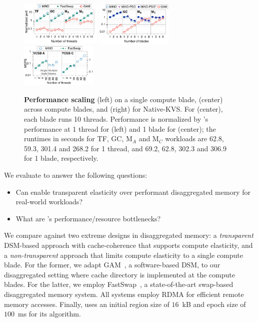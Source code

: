 \begin{figure}[ht!]
  \centering
  \includegraphics[width=0.345\textwidth]{fig/mind/04_intra}\hspace{-0.25em}
  \includegraphics[width=0.3266\textwidth]{fig/mind/04_inter}\hspace{-0.25em}
  \includegraphics[width=0.3247\textwidth]{fig/mind/04_kvs}
  \vspace{-0.7em}
  \caption[Performance scaling]{\textbf{Performance scaling} (left) on a single compute blade, (center) across compute blades, and (right) for Native-KVS. For (center), each blade runs 10 threads. Performance is normalized by \mind's performance at 1 thread for (left) and 1 blade for (center); the runtimes in seconds for TF, GC, M$_A$ and M$_C$ workloads are 62.8, 59.3, 301.4 and 268.2 for 1 thread, and 69.2, 62.8, 302.3 and 306.9 for 1 blade, respectively.}
\label{fig:perf}
\label{fig:perf_intra}
\label{fig:perf_inter}
\label{fig:perf_kvs}
\end{figure}


We evaluate \mind to answer the following questions:
\begin{itemize}[topsep=2pt, partopsep=0pt, itemsep=0pt, leftmargin=*]
  \item Can \mind enable transparent elasticity over performant disaggregated memory for real-world workloads?
  \item What are \mind's performance/resource bottlenecks?
\end{itemize}
 We compare \mind against two extreme designs in disaggregated memory: a \textit{transparent} DSM-based approach with cache-coherence that supports compute elasticity, and a \textit{non-transparent} approach that limits compute elasticity to a single compute blade. For the former, we adapt GAM~\cite{gam}, a software-based DSM, to our disaggregated setting where cache directory is implemented at the compute blades. For the latter, we employ FastSwap~\cite{fastswap}, a state-of-the-art swap-based disaggregated memory system. All systems employ RDMA for efficient remote memory accesses. Finally, \mind uses an initial region size of $16$~kB and epoch size of $100$~ms for its \mindalgo algorithm.

